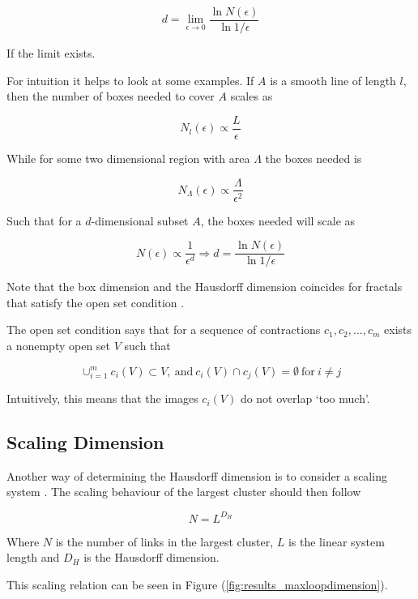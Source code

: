 \begin{equation}
    d = \lim_{\epsilon \to 0} \frac{\ln N(\epsilon)}{\ln 1 / \epsilon}
\end{equation}

If the limit exists.

For intuition it helps to look at some examples. If $A$ is a smooth line of length $l$, then the number of boxes needed to cover $A$ scales as

\begin{equation}
    N_l(\epsilon) \propto \frac{L}{\epsilon}
\end{equation}

While for some two dimensional region with area $\Lambda$ the boxes needed is

\begin{equation}
    N_{\Lambda}(\epsilon) \propto \frac{\Lambda}{\epsilon^2}
\end{equation}

Such that for a $d$-dimensional subset $A$, the boxes needed will scale as

\begin{equation}
    N (\epsilon) \propto \frac{1}{\epsilon^d} \Rightarrow d = \frac{\ln N(\epsilon)}{\ln 1 / \epsilon}
\end{equation}

Note that the box dimension and the Hausdorff dimension coincides for fractals that satisfy the open set condition \cite{Falconer:RelHausdorffBox}.

The open set condition says that for a sequence of contractions $c_1, c_2, ..., c_m$ exists a nonempty open set $V$ such that \cite{Bandt:OSC}

\begin{equation}
    \cup_{i = 1}^m c_i(V) \subset V, \ \text{and} \ c_i(V) \cap c_j(V) = \emptyset \ \text{for} \ i \neq j
\end{equation}

Intuitively, this means that the images $c_i(V)$ do not overlap `too much'.

\subsection{Scaling Dimension}
\label{subsec:ScalingDimension}

Another way of determining the Hausdorff dimension is to consider a scaling system \cite{Camarda:MethodsDetermineHausdorff}. The scaling behaviour of the largest cluster should then follow

\begin{equation}
    N = L^{D_H}
\end{equation}

Where $N$ is the number of links in the largest cluster, $L$ is the linear system length and $D_H$ is the Hausdorff dimension.

This scaling relation can be seen in Figure (\ref{fig:results_maxloopdimension}).


